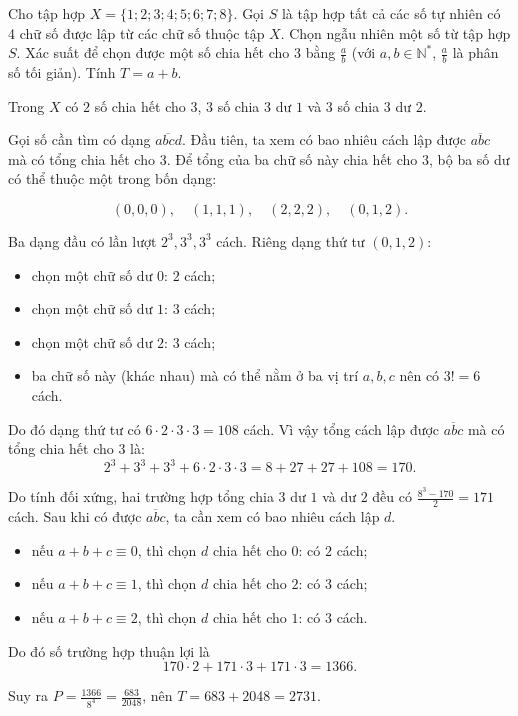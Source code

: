 \begin{baitap}
	Cho tập hợp $X = \{1; 2; 3; 4; 5; 6; 7; 8\}$. Gọi $S$ là tập hợp tất cả các số tự nhiên có 4 chữ số được lập từ các chữ số thuộc tập $X$. Chọn ngẫu nhiên một số từ tập hợp $S$. Xác suất để chọn được một số chia hết cho 3 bằng $\frac{a}{b}$ (với $a, b \in \mathbb{N}^*$, $\frac{a}{b}$ là phân số tối giản). Tính $T = a + b$.
	\begin{traloi}
		Trong $X$ có $2$ số chia hết cho $3$, $3$ số chia $3$ dư $1$ và $3$ số chia $3$ dư $2$.
		
		Gọi số cần tìm có dạng $ \overline{abcd} $. Đầu tiên, ta xem có bao nhiêu cách lập được $ \overline{abc} $ mà có tổng chia hết cho $ 3 $. Để tổng của ba chữ số này chia hết cho \(3\), bộ ba số dư có thể thuộc một trong bốn dạng:
		
		\[
		(0,0,0),\quad (1,1,1),\quad (2,2,2),\quad (0,1,2).
		\]
		
		Ba dạng đầu có lần lượt \(2^3,3^3,3^3\) cách. Riêng dạng thứ tư \((0,1,2)\):
		\begin{itemize}
			\item chọn một chữ số dư \(0\): \(2\) cách;
			\item chọn một chữ số dư \(1\): \(3\) cách;
			\item chọn một chữ số dư \(2\): \(3\) cách;
			\item ba chữ số này (khác nhau) mà có thể nằm ở ba vị trí \(a,b,c\) nên có \(3!=6\) cách.
		\end{itemize}			
		Do đó dạng thứ tư có \(6\cdot2\cdot3\cdot3=108\) cách. Vì vậy tổng cách lập được $ \overline{abc} $ mà có tổng chia hết cho $ 3 $ là:
		\[
		2^3+3^3+3^3+6\cdot2\cdot3\cdot3
		=8+27+27+108
		=170.
		\]
		
		Do tính đối xứng, hai trường hợp tổng chia $3$ dư $1$ và dư $2$ đều có
		$\frac{8^3-170}{2}=171$ cách. Sau khi có được $ \overline{abc} $, ta cần xem có bao nhiêu cách lập $ d $. 
		\begin{itemize}
			\item nếu \(a+b+c\equiv0\), thì chọn \(d\) chia hết cho $ 0 $: có \(2\) cách;
			\item nếu \(a+b+c\equiv1\), thì chọn \(d\) chia hết cho $ 2 $: có \(3\) cách;
			\item nếu \(a+b+c\equiv2\), thì chọn \(d\) chia hết cho $ 1 $: có \(3\) cách.
		\end{itemize}
		Do đó số trường hợp thuận lợi là
		$$170\cdot2+171\cdot3+171\cdot3=1366.$$
		
		Suy ra $P=\frac{1366}{8^4}=\frac{683}{2048}$, nên $T=683+2048=2731$.
	\end{traloi}
\end{baitap}

